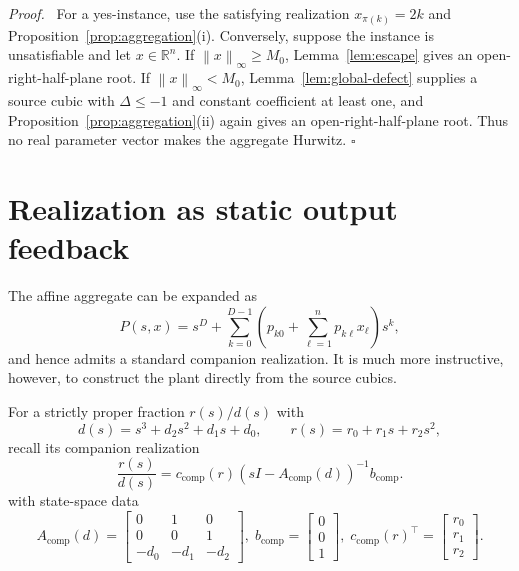 \documentclass[final,5p,times,twocolumn]{elsarticle}
\newcommand{\R}{\mathbb R}
\newcommand{\norm}[1]{\left\|#1\right\|}
\newenvironment{proof}[1][Proof]
  {\par\smallskip\noindent\textit{#1.}\ }
  {\hfill$\square$\par\smallskip}
\begin{document}
\begin{proof}
For a yes-instance, use the satisfying realization $x_{\pi(k)}=2k$ and Proposition~\ref{prop:aggregation}(i). Conversely, suppose the instance is unsatisfiable and let $x\in\R^n$. If $\norm{x}_\infty\ge M_0$, Lemma~\ref{lem:escape} gives an open-right-half-plane root. If $\norm{x}_\infty<M_0$, Lemma~\ref{lem:global-defect} supplies a source cubic with $\Delta\le-1$ and constant coefficient at least one, and Proposition~\ref{prop:aggregation}(ii) again gives an open-right-half-plane root. Thus no real parameter vector makes the aggregate Hurwitz.
\end{proof}

\section{Realization as static output feedback}\label{sec:realization}

The affine aggregate can be expanded as
\[
P(s,x)=s^D+\sum_{k=0}^{D-1}
\left(p_{k0}+\sum_{\ell=1}^n p_{k\ell}x_\ell\right)s^k,
\]
and hence admits a standard companion realization. It is much more instructive, however, to construct the plant directly from the source cubics.

For a strictly proper fraction $r(s)/d(s)$ with
\[
d(s)=s^3+d_2s^2+d_1s+d_0,
\qquad
r(s)=r_0+r_1s+r_2s^2,
\]
recall its companion realization
\begin{equation}\label{eq:comp-transfer}
\frac{r(s)}{d(s)}=c_{\mathrm{comp}}(r)(sI-A_{\mathrm{comp}}(d))^{-1}b_{\mathrm{comp}}.
\end{equation}
with state-space data
\[
A_{\mathrm{comp}}(d)=
\begin{bmatrix}
0&1&0\\
0&0&1\\
-d_0&-d_1&-d_2
\end{bmatrix},\;
b_{\mathrm{comp}}=\begin{bmatrix}0\\0\\1\end{bmatrix},
\;
c_{\mathrm{comp}}(r)^\top=\begin{bmatrix}r_0\\r_1\\r_2\end{bmatrix}.
\]
\end{document}

